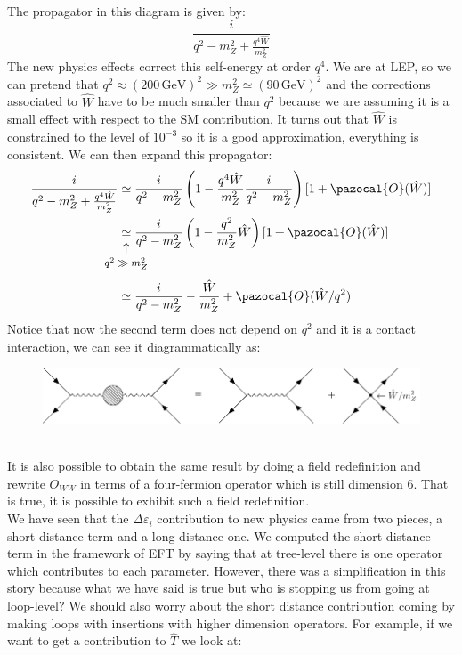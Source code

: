 \documentclass[../main.tex]{subfiles}
\begin{document}
The propagator in this diagram is given by:
\[
\frac{i}{q^2-m_Z^2+\frac{q^4\hat{W}}{m_Z^2}}
\]
The new physics effects correct this self-energy at order $q^4$. We are at LEP, so we can pretend that $q^2\approx(200\,\text{GeV})^2\gg m_Z^2\simeq(90\,\text{GeV})^2$ and the corrections associated to $\hat{W}$ have to be much smaller than $q^2$ because we are assuming it is a small effect with respect to the SM contribution. It turns out that $\hat{W}$ is constrained to the level of $10^{-3}$ so it is a good approximation, everything is consistent. We can then expand this propagator:
\begin{align*}
\frac{i}{q^2-m_Z^2+\frac{q^4\hat{W}}{m_Z^2}}&\simeq\frac{i}{q^2-m_Z^2}\left(1-\frac{q^4\hat{W}}{m_Z^2}\frac{i}{q^2-m_Z^2}\right)[1+\pazocal{O}(\hat{W})]\\
&\underset{\mathclap{\tikz \node {$\uparrow$} node [below=1ex] {\footnotesize $q^2\gg m_Z^2$ };}}{\simeq}\frac{i}{q^2-m_Z^2}\left(1-\frac{q^2}{m_Z^2}\hat{W}\right)[1+\pazocal{O}(\hat{W})]\\
&\simeq\frac{i}{q^2-m_Z^2}-\frac{\hat{W}}{m_Z^2}+\pazocal{O}(\hat{W}/q^2)
\end{align*}
Notice that now the second term does not depend on $q^2$ and it is a contact interaction, we can see it diagrammatically as:
\begin{figure}[h]
    \centering
    \includegraphics{Images/contact.pdf}
    \caption*{}
\end{figure}\\
It is also possible to obtain the same result by doing a field redefinition and rewrite $O_{WW}$ in terms of a four-fermion operator which is still dimension 6. That is true, it is possible to exhibit such a field redefinition.\\
We have seen that the $\Delta\varepsilon_i$ contribution to new physics came from two pieces, a short distance term and a long distance one. We computed the short distance term in the framework of EFT by saying that at tree-level there is one operator which contributes to each parameter. However, there was a simplification in this story because what we have said is true but who is stopping us from going at loop-level? We should also worry about the short distance contribution coming by making loops with insertions with higher dimension operators. For example, if we want to get a contribution to $\hat{T}$ we look at:
\end{document}
